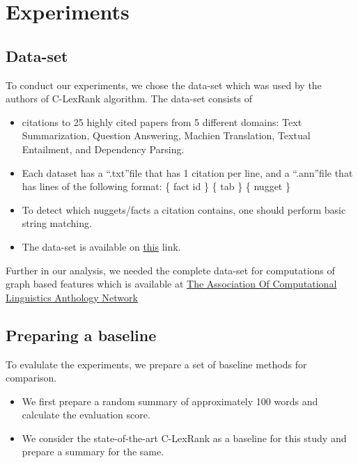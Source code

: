\chapter{Experiments}
\section{Data-set}
To conduct our experiments, we chose the data-set which was used by the authors of C-LexRank algorithm. The data-set consists of 
\begin{itemize}
\item citations to 25 highly cited papers from 5 different domains: Text Summarization, Question Answering, Machien Translation, Textual Entailment, and Dependency Parsing.
\item Each dataset has a \textquotedblleft *.txt\textquotedblright file that has 1 citation per line, and a \textquotedblleft*.ann\textquotedblright file that has lines of the following format: \{ fact id \} \{ tab \} \{ nugget \}
\item To detect which nuggets/facts a citation contains, one should perform basic string matching.
\item The data-set is available on \href{http://www-personal.umich.edu/~vahed/resources/single.tar.gz}{this} link.
\end{itemize}
Further in our analysis, we needed the complete data-set for computations of graph based features which is available at \href{http://clair.eecs.umich.edu/aan/index.php}{The Association Of Computational Linguistics Anthology Network
}
\section{Preparing a baseline}
To evalulate the experiments, we prepare a set of baseline methods for comparison. 
\begin{itemize}
\item We first prepare a random summary of approximately 100 words and calculate the evaluation score.
\item We consider the state-of-the-art C-LexRank as a baseline for this study and prepare a summary for the same.
\end{itemize}
